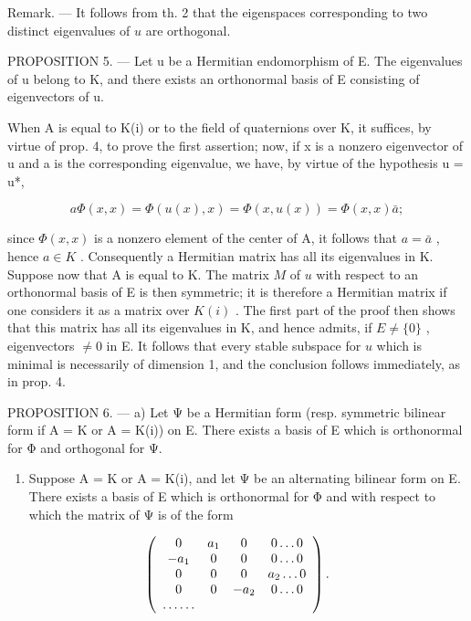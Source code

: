 Remark. --- It follows from th. 2 that the eigenspaces corresponding to two distinct eigenvalues of \(u\) are orthogonal.

PROPOSITION 5. --- Let u be a Hermitian endomorphism of E. The eigenvalues of u belong to K, and there exists an orthonormal basis of E consisting of eigenvectors of u.

When A is equal to K(i) or to the field of quaternions over K, it suffices, by virtue of prop. 4, to prove the first assertion; now, if x is a nonzero eigenvector of u and a is the corresponding eigenvalue, we have, by virtue of the hypothesis u = u*,

\[
a \Phi (x, x) = \Phi (u (x), x) = \Phi (x, u (x)) = \Phi (x, x) \bar {a};
\]

since \(\Phi(x, x)\) is a nonzero element of the center of A, it follows that \(a = \bar{a}\) , hence \(a \in K\) . Consequently a Hermitian matrix has all its eigenvalues in K. Suppose now that A is equal to K. The matrix \(M\) of \(u\) with respect to an orthonormal basis of E is then symmetric; it is therefore a Hermitian matrix if one considers it as a matrix over \(K(i)\) . The first part of the proof then shows that this matrix has all its eigenvalues in K, and hence admits, if \(E \neq \{0\}\) , eigenvectors \(\neq 0\) in E. It follows that every stable subspace for \(u\) which is minimal is necessarily of dimension 1, and the conclusion follows immediately, as in prop. 4.

PROPOSITION 6. --- a) Let Ψ be a Hermitian form (resp. symmetric bilinear form if A = K or A = K(i)) on E. There exists a basis of E which is orthonormal for Φ and orthogonal for Ψ.

\begin{enumerate}
\def\labelenumi{\alph{enumi})}
\setcounter{enumi}{1}
\tightlist
\item
  Suppose A = K or A = K(i), and let Ψ be an alternating bilinear form on E. There exists a basis of E which is orthonormal for Φ and with respect to which the matrix of Ψ is of the form
\end{enumerate}

\[
\left( \begin{array}{c c c c} 0 & a _ {1} & 0 & 0 \ldots 0 \\ - a _ {1} & 0 & 0 & 0 \ldots 0 \\ 0 & 0 & 0 & a _ {2} \ldots 0 \\ 0 & 0 & - a _ {2} & 0 \ldots 0 \\ \ldots \ldots \end{array} \right).
\]

